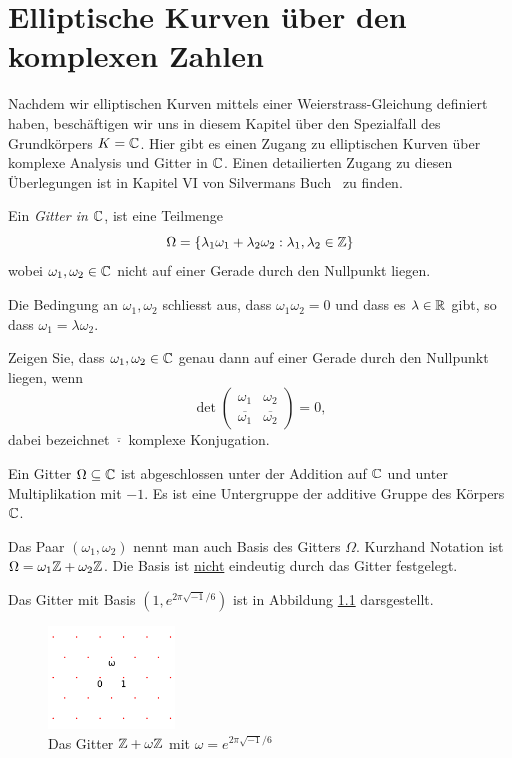 \chapter{Elliptische Kurven über den komplexen Zahlen}

Nachdem wir elliptischen Kurven mittels einer Weierstrass-Gleichung
definiert haben, beschäftigen wir uns in diesem Kapitel über den
Spezialfall des Grundkörpers $K={\mathbb{C}}$. Hier gibt es einen Zugang zu
elliptischen Kurven über komplexe Analysis und Gitter in ${\mathbb{C}}$. Einen
detailierten Zugang zu diesen Überlegungen ist in Kapitel VI von
Silvermans Buch~\cite{Silverman:AEC} zu finden. 

\begin{definition}
  Ein \emph{Gitter in ${\mathbb{C}}$}, ist eine
  Teilmenge
  $$\Omega = \{\lambda_1 \omega_1 + \lambda_2 \omega_2 :
  \lambda_1,\lambda_2\in{\mathbb{Z}}\}$$
  wobei $\omega_1,\omega_2\in{\mathbb{C}}$ nicht auf einer Gerade
  durch den Nullpunkt liegen. 
\end{definition}

Die Bedingung an $\omega_1,\omega_2$ schliesst aus, dass
$\omega_1\omega_2=0$ und dass es $\lambda\in{\mathbb{R}}$ gibt, so dass
$\omega_1 = \lambda\omega_2$.

\begin{aufgabe}
  Zeigen Sie, dass $\omega_1,\omega_2\in{\mathbb{C}}$ genau dann auf einer
  Gerade durch den Nullpunkt liegen, wenn
  \begin{equation*}
    \det \left(
      \begin{array}{ll}
        \omega_1 & \omega_2 \\
        \overline{\omega_1} & \overline{\omega_2}
      \end{array}
    \right)=0,
  \end{equation*}
  dabei bezeichnet $\overline{\cdot}$ komplexe Konjugation. 
\end{aufgabe}

Ein Gitter $\Omega\subseteq{\mathbb{C}}$ ist abgeschlossen unter der Addition auf
${\mathbb{C}}$ und unter Multiplikation mit $-1$. Es ist eine Untergruppe der
additive Gruppe des Körpers ${\mathbb{C}}$.

Das Paar $(\omega_1,\omega_2)$ nennt man auch Basis des Gitters
$\Omega$. Kurzhand Notation ist $\Omega = \omega_1{\mathbb{Z}} +\omega_2{\mathbb{Z}}$.
Die Basis ist \underline{nicht} eindeutig durch das Gitter festgelegt.


\begin{beispiel}
  Das Gitter mit Basis $(1,e^{2\pi
    \sqrt{-1}/6})$
  ist in Abbildung
  \ref{fig:lattice} darsgestellt. 
  \begin{figure}
    \centering    
    \caption{Das Gitter ${\mathbb{Z}}+\omega{\mathbb{Z}}$ mit $\omega = e^{2\pi\sqrt{-1}/6}$}
    \label{fig:lattice}
    \includegraphics[width=0.3\textwidth]{./plots/lattice.png}
  \end{figure}
\end{beispiel}

